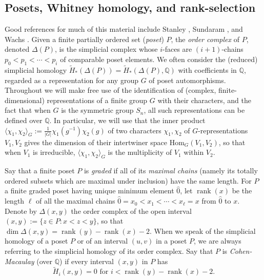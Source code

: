 \documentclass[12pt]{amsart}
\theoremstyle{plain}
\theoremstyle{definition}
\begin{document}
\subsection{Posets, Whitney homology, and 
rank-selection}
\label{poset-subsection}

Good references for much of this material include Stanley \cite{Stanley-aspects},
Sundaram \cite{Sundaram}, and Wachs \cite{Wachs-Park-City}.
Given a finite partially ordered set ({\it poset}) $P$, 
the  {\it order complex} of $P$, denoted $\Delta (P)$, is the simplicial complex whose $i$-faces are  $(i+1)$-chains $p_0 < p_1 < \cdots < p_i$ of comparable poset elements.  We often consider the (reduced) simplicial homology $\tilde{H}_*(\Delta(P))=\tilde{H}_*(\Delta(P),{{\mathbb Q}})$ with coefficients in ${{\mathbb Q}}$, regarded as
a representation for any group $G$ of 
poset automorphisms. Throughout we will make 
free use of the identification of (complex, finite-dimensional)
representations of a finite group
$G$ with their characters, and  the fact that when $G$ is the symmetric
group $S_n$, all such representations can be defined over ${{\mathbb Q}}$.
In particular, we will use that 
the inner product $\langle \chi_1,\chi_2 \rangle_G:=\frac{1}{|G|} \chi_1(g^{-1}) \chi_2(g)$ of two characters $\chi_1,\chi_2$ of $G$-representations $V_1,V_2$ 
gives the dimension of their
intertwiner space ${\mathrm{Hom}}_G(V_1,V_2)$,
so that when $V_1$ is irreducible, $\langle \chi_1,\chi_2 \rangle_G$
is the multiplicity of $V_1$ within $V_2$.

Say that a finite poset $P$ is {\it graded} if all of its 
{\it maximal chains} (namely its totally ordered subsets which are maximal 
under inclusion) have the same length.  For $P$ a 
finite graded poset having unique minimum element $\hat{0}$,
let ${{\operatorname{rank}}}(x)$ be the length $\ell$
of all the maximal chains $\hat{0}=x_0 < x_1 < \cdots < x_{\ell}=x$ from $\hat{0}$ to $x$.
Denote by $\Delta(x,y)$ the order complex of the open interval
$(x,y):=\{z \in P: x < z < y\}$, so that $\dim \Delta(x,y)={{\operatorname{rank}}}(y)-{{\operatorname{rank}}}(x)-2$.   When we speak of
the simplicial homology of a poset $P$ or of an interval $(u,v)$ in a poset $P$, we are always 
referring to the simplicial homology of its order complex.  
Say that 
$P$ is {\it Cohen-Macaulay} (over ${{\mathbb Q}}$) if every interval $(x,y)$ in $P$ 
has 
$$
\tilde{H}_i(x,y)=0 \text{ for  }i < {{\operatorname{rank}}}(y)-{{\operatorname{rank}}}(x)-2. 
$$
\end{document}
